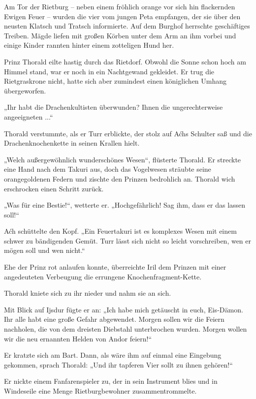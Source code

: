 \trennzeichen



Am Tor der Rietburg – neben einem fröhlich orange vor sich hin flackernden Ewigen Feuer – wurden die vier vom jungen Peta empfangen, der sie über den neusten Klatsch und Tratsch informierte. Auf dem Burghof herrschte geschäftiges Treiben. Mägde liefen mit großen Körben unter dem Arm an ihm vorbei und einige Kinder rannten hinter einem zotteligen Hund her.

Prinz Thorald eilte hastig durch das Rietdorf. Obwohl die Sonne schon hoch am Himmel stand, war er noch in ein Nachtgewand gekleidet. Er trug die Rietgraskrone nicht, hatte sich aber zumindest einen königlichen Umhang übergeworfen.

„Ihr habt die Drachenkultisten überwunden? Ihnen die ungerechterweise angeeigneten ...“

Thorald verstummte, als er Turr erblickte, der stolz auf Aćhs Schulter saß und die Drachenknochenkette in seinen Krallen hielt.

„Welch außergewöhnlich wunderschönes Wesen“, flüsterte Thorald. Er streckte eine Hand nach dem Takuri aus, doch das Vogelwesen sträubte seine orangegoldenen Federn und zischte den Prinzen bedrohlich an. Thorald wich erschrocken einen Schritt zurück.

„Was für eine Bestie!“, wetterte er. „Hochgefährlich! Sag ihm, dass er das lassen soll!“

Aćh schüttelte den Kopf. „Ein Feuertakuri ist es komplexes Wesen mit einem schwer zu bändigenden Gemüt. Turr lässt sich nicht so leicht vorschreiben, wen er mögen soll und wen nicht.“

Ehe der Prinz rot anlaufen konnte, überreichte Iril dem Prinzen mit einer angedeuteten Verbeugung die errungene Knochenfragment-Kette.

Thorald kniete sich zu ihr nieder und nahm sie an sich.

Mit Blick auf Ijsdur fügte er an: „Ich habe mich getäuscht in euch, Eis-Dämon. Ihr alle habt eine große Gefahr abgewendet. Morgen sollen wir die Feiern nachholen, die von dem dreisten Diebstahl unterbrochen wurden. Morgen wollen wir die neu ernannten Helden von Andor feiern!“

Er kratzte sich am Bart. Dann, als wäre ihm auf einmal eine Eingebung gekommen, sprach Thorald: „Und ihr tapferen Vier sollt zu ihnen gehören!“

Er nickte einem Fanfarenspieler zu, der in sein Instrument blies und in Windeseile eine Menge Rietburgbewohner zusammentrommelte.


